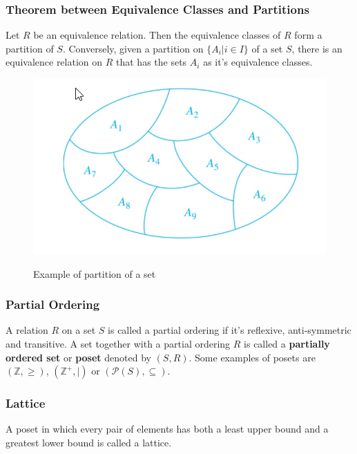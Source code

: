 \documentclass{article}
\begin{document}
\subsubsection{Theorem between Equivalence Classes and Partitions}
\begin{tcolorbox}[sharp corners, colback=green!30, colframe=green!80!blue, title=Union of equivalence classes]
Let $ R $ be an equivalence relation. Then the equivalence classes of $ R $ form a partition of $ S $. Conversely, given a partition on $ \{A_i | i \in I\} $ of a set $ S $, there is an equivalence relation on $ R $ that has the sets $ A_i $ as it's equivalence classes.
\end{tcolorbox}

\begin{figure}[h]
  \includegraphics[width=\linewidth]{partitions.png}
  \label{fig:partitions}
	
\caption{Example of partition of a set}	
\end{figure}

\subsubsection{Partial Ordering} A relation $ R $ on a set $ S $ is called a partial ordering if it's reflexive, anti-symmetric and transitive. A set together with a partial ordering $ R $ is called a \textbf{partially ordered set} or \textbf{poset} denoted by $ (S,R) $. Some examples of posets are $ (\mathbb{Z},\geq) $, $ (\mathbb{Z^+}, |) $ or $ (\mathcal{P}(S), \subseteq) $.

\subsubsection{Lattice} A poset in which every pair of elements has both a least upper bound and a greatest lower bound is called a lattice.
\end{document}
